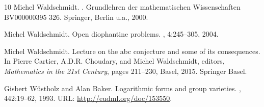 \documentclass[10pt,a4paper]{article}
\theoremstyle{definition}
\numberwithin{equation}{section}
\begin{document}
\begin{thebibliography}{10}
Michel Waldschmidt.
.
\newblock Grundlehren der mathematischen Wissenschaften BV000000395 326.
  Springer, Berlin u.a., 2000.

Michel Waldschmidt.
\newblock Open diophantine problems.
, 4:245--305, 2004.

Michel Waldschmidt.
\newblock Lecture on the abc conjecture and some of its consequences.
\newblock In Pierre Cartier, A.D.R. Choudary, and Michel Waldschmidt, editors,
  {\em Mathematics in the 21st Century}, pages 211--230, Basel, 2015. Springer
  Basel.

Gisbert W\"{u}stholz and Alan Baker.
\newblock Logarithmic forms and group varieties.
,
  442:19--62, 1993.
\newblock URL: \url{http://eudml.org/doc/153550}.

\end{thebibliography}
\end{document}
